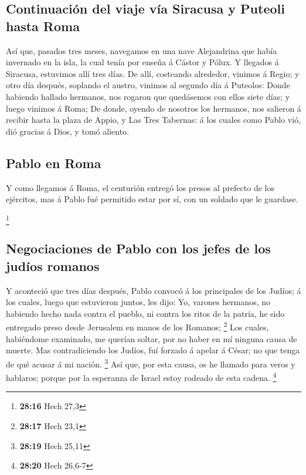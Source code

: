 \hypertarget{continuaciuxf3n-del-viaje-vuxeda-siracusa-y-puteoli-hasta-roma}{%
\subsection{Continuación del viaje vía Siracusa y Puteoli hasta
Roma}\label{continuaciuxf3n-del-viaje-vuxeda-siracusa-y-puteoli-hasta-roma}}

 Así que, pasados tres meses, navegamos en una nave
Alejandrina que había invernado en la isla, la cual tenía por enseña á
Cástor y Pólux.  Y llegados á Siracusa, estuvimos allí tres
días.  De allí, costeando alrededor, vinimos á Regio; y
otro día después, soplando el austro, vinimos al segundo día á Puteolos:
 Donde habiendo hallado hermanos, nos rogaron que
quedásemos con ellos siete días; y luego vinimos á Roma; 
De donde, oyendo de nosotros los hermanos, nos salieron á recibir hasta
la plaza de Appio, y Las Tres Tabernas: á los cuales como Pablo vió, dió
gracias á Dios, y tomó aliento.

\hypertarget{pablo-en-roma}{%
\subsection{Pablo en Roma}\label{pablo-en-roma}}

 Y como llegamos á Roma, el centurión entregó los presos al
prefecto de los ejércitos, mas á Pablo fué permitido estar por sí, con
un soldado que le guardase.

\footnote{\textbf{28:16} Hech 27,3}

\hypertarget{negociaciones-de-pablo-con-los-jefes-de-los-juduxedos-romanos}{%
\subsection{Negociaciones de Pablo con los jefes de los judíos
romanos}\label{negociaciones-de-pablo-con-los-jefes-de-los-juduxedos-romanos}}

 Y aconteció que tres días después, Pablo convocó á los
principales de los Judíos; á los cuales, luego que estuvieron juntos,
les dijo: Yo, varones hermanos, no habiendo hecho nada contra el pueblo,
ni contra los ritos de la patria, he sido entregado preso desde
Jerusalem en manos de los Romanos; \footnote{\textbf{28:17} Hech 23,1}
 Los cuales, habiéndome examinado, me querían soltar, por
no haber en mí ninguna causa de muerte.  Mas contradiciendo
los Judíos, fuí forzado á apelar á César; no que tenga de qué acusar á
mi nación. \footnote{\textbf{28:19} Hech 25,11}  Así que,
por esta causa, os he llamado para veros y hablaros; porque por la
esperanza de Israel estoy rodeado de esta cadena. \footnote{\textbf{28:20}
  Hech 26,6-7}

